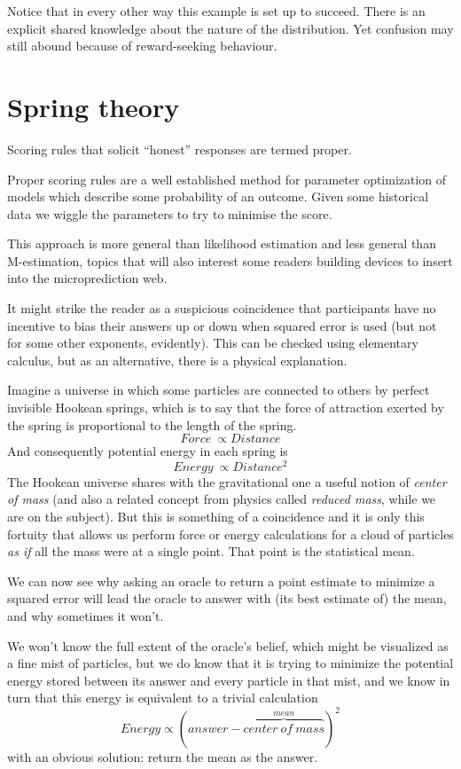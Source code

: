 Notice that in every other way this example is set up to succeed. There is an explicit shared knowledge about the nature of the distribution. Yet confusion may still abound because of reward-seeking behaviour.   


\section{Spring theory}

Scoring rules that solicit ``honest'' responses are termed proper. 

Proper scoring rules are a well established method for parameter optimization of models which describe some probability of an outcome. Given some historical data we wiggle the parameters to try to minimise the score. 


This approach is more general than likelihood estimation and less general than M-estimation, topics that will also interest some readers building devices to insert into the microprediction web.

It might strike the reader as a suspicious coincidence that participants have no incentive to bias their answers up or down when squared error is used (but not for some other exponents, evidently). This can be checked using elementary calculus, but as an alternative, there is a physical explanation.  

Imagine a universe in which some particles are connected to others by perfect invisible Hookean springs, which is to say that the force of attraction exerted by the spring is proportional to the length of the spring.
$$
     Force\ \propto Distance
$$
And consequently potential energy in each spring is
$$
    Energy\ \propto Distance^2
$$
The Hookean universe shares with the gravitational one a useful notion of {\em center of mass} (and also a related concept from physics called {\em reduced mass}, while we are on the subject). But this is something of a coincidence and it is only this fortuity that allows us perform force or energy calculations for a cloud of particles {\em as if} all the mass were at a single point. That point is the statistical mean.

We can now see why asking an oracle to return a point estimate to minimize a squared error will lead the oracle to answer with (its best estimate of) the mean, and why sometimes it won't. 

We won't know the full extent of the oracle's belief, which might be visualized as a fine mist of particles, but we do know that it is trying to minimize the potential energy stored between its answer and every particle in that mist, and we know in turn that this energy is equivalent to a trivial calculation
$$
     Energy \propto (answer - \overbrace{center\ of\ mass}^{mean})^2
$$
with an obvious solution: return the mean as the answer. 

